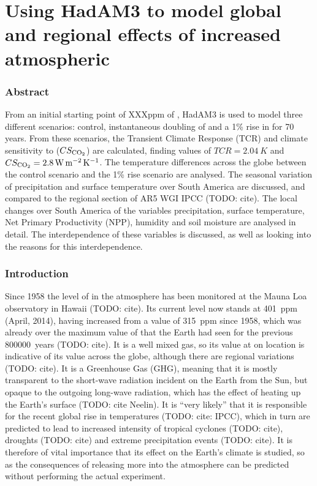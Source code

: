 \documentclass{article}
\begin{document}
\part*{Using HadAM3 to model global and regional effects of increased atmospheric }

\section*{Abstract}

From an initial starting point of XXXppm of , HadAM3 is used to model three different scenarios: control, instantaneous doubling of  and a 1\% rise in  for 70 years. From these scenarios, the Transient Climate Response (TCR) and climate sensitivity to  ($CS_{\ce{CO2}}$) are calculated, finding values of $TCR = \SI{2.04}{K}$ and $CS_{\ce{CO2}} = \SI{2.8}{W.m^{-2}.K^{-1}}$. The temperature differences across the globe between the control scenario and the 1\% rise scenario are analysed. The seasonal variation of precipitation and surface temperature over South America are discussed, and compared to the regional section of AR5 WGI IPCC (TODO: cite). The local changes over South America of the variables precipitation, surface temperature, Net Primary Productivity (NPP), humidity and soil moisture are analysed in detail. The interdependence of these variables is discussed, as well as looking into the reasons for this interdependence.

\section{Introduction}

Since 1958 the level of  in the atmosphere has been monitored at the Mauna Loa observatory in Hawaii (TODO: cite). Its current level now stands at \SI{401}{ppm} (April, 2014), having increased from a value of \SI{315}{ppm} since 1958, which was already over the maximum value of  that the Earth had seen for the previous \SI{800 000}{years} (TODO: cite). It is a well mixed gas, so its value at on location is indicative of its value across the globe, although there are regional variations (TODO: cite). It is a Greenhouse Gas (GHG), meaning that it is mostly transparent to the short-wave radiation incident on the Earth from the Sun, but opaque to the outgoing long-wave radiation, which has the effect of heating up the Earth's surface (TODO: cite Neelin). It is ``very likely'' that it is responsible for the recent global rise in temperatures (TODO: cite: IPCC), which in turn are predicted to lead to increased intensity of tropical cyclones (TODO: cite), droughts (TODO: cite) and extreme precipitation events (TODO: cite). It is therefore of vital importance that its effect on the Earth's climate is studied, so as the consequences of releasing more  into the atmosphere can be predicted without performing the actual experiment.
\end{document}
